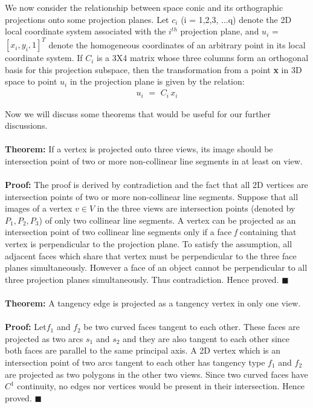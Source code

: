 \documentclass[
11pt, %
english, %
singlespacing, %
headsepline, %
]{MastersDoctoralThesis} %
\begin{document}
We now consider the relationship between  space conic and its orthographic projections onto some projection planes. Let \textbf{$c_i$} (i = 1,2,3, ...q) denote the 2D local coordinate system associated with the $i^{th}$ projection plane, and \textbf{$u_i$} = $[x_i, y_i, 1]^T$ denote the homogeneous coordinates of an arbitrary point in its local coordinate system. If \textbf{$C_i$} is a 3X4 matrix whose three columns form an orthogonal basis for this projection subspace, then the transformation from a point \textbf{x} in 3D space to point \textbf{$u_i$} in the projection plane is given by the relation:
\begin{align*} \textbf{$u_i\,\,=\,\,C_i\,x_i$} \tag{2.5.3} \end{align*}

Now we will discuss some theorems that would be useful for our further discussions.\\ \\

\textbf{Theorem: } If a vertex is projected onto three views, its image should be intersection point of two or more non-collinear line segments in at least on view. \\ \\
\textbf{Proof: }The proof is derived by contradiction and the fact that all 2D vertices are intersection points of two or more non-collinear line segments. Suppose that all images of a vertex $v\in V$ in the three views are intersection points (denoted by $P_1, P_2, P_3$) of only two collinear line segments. A vertex can be projected as an intersection point of two collinear line segments only if a face \emph{f} containing that vertex is perpendicular to the projection plane. To satisfy the assumption, all adjacent faces which share that vertex must be perpendicular to the three face planes simultaneously. However a face of an object cannot be perpendicular to all three projection planes simultaneously. Thus contradiction. Hence proved.  $\blacksquare$
\\ \\

\textbf{Theorem: } A tangency edge is projected as a tangency vertex in only one view. \\ \\
\textbf{Proof: }Let$f_1$ and $f_2$ be two curved faces tangent to each other. These faces are projected as two arcs $s_1$ and $s_2$ and they are also tangent to each other since both faces are parallel to the same principal axis. A 2D vertex which is an intersection point of two arcs tangent to each other has tangency type $f_1$ and $f_2$ are projected as two polygons in the other two views. Since two curved faces have $C^1$ continuity, no edges nor vertices would be present in their intersection. Hence proved.  $\blacksquare$
\\ \\
\end{document}
